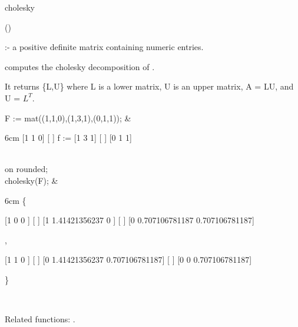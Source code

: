 \begin{Operator}{cholesky}

\begin{Syntax}
()
\end{Syntax}

 :- a positive definite matrix containing numeric entries.

 computes the cholesky decomposition of .

It returns \{L,U\} where L is a lower matrix, U is an upper matrix, 
A = LU, and U = $L^T$.

\begin{Examples}
F := mat((1,1,0),(1,3,1),(0,1,1)); &
\begin{multilineoutput}{6cm}
     [1  1  0]
     [       ]
f := [1  3  1]
     [       ]
     [0  1  1]
\end{multilineoutput} \\

on rounded; \\
cholesky(F); & 
\begin{multilineoutput}{6cm}
\{

 [1        0               0       ]
 [                                 ]
 [1  1.41421356237         0       ]
 [                                 ]
 [0  0.707106781187  0.707106781187]

 ,


 [1        1              0       ]
 [                                ]
 [0  1.41421356237  0.707106781187]
 [                                ]
 [0        0        0.707106781187]

\}
\end{multilineoutput} \\

\end{Examples}

Related functions: .

\end{Operator}



